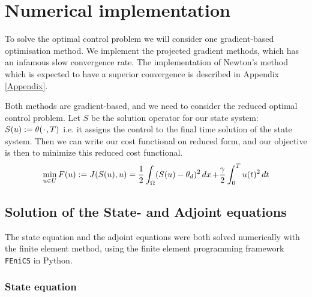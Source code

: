 
\section{Numerical implementation}

To solve the optimal control problem we will consider one gradient-based optimisation method. We implement the projected gradient methods, which has an infamous slow convergence rate. The implementation of Newton's method which is expected to have a superior convergence is described in Appendix \ref{Appendix}.

Both methods are gradient-based, and we need to consider the reduced optimal control problem. Let $S$ be the solution operator for our state system:  $S(u):=\theta(\placeholder ,T)$ i.e. it assigns the control to the final time solution of the state system. Then we can write our cost functional on reduced form, and our objective is then to minimize this reduced cost functional.
\begin{equation}
\label{eq:optimization_prob}
    \min_{u \in U}F(u) := J(S(u),u) = \frac{1}{2}\int_{\Omega}(S(u) - \theta_d)^2 \mathop{dx}+ \frac{\gamma}{2}\int_0^Tu(t)^2\mathop{dt}
\end{equation}

\subsection{Solution of the State- and Adjoint equations}

The state equation and the adjoint equations were both solved numerically with the finite element method, using the finite element programming framework \verb|FEniCS| \cite{fenics} in Python.


\subsubsection{State equation}

